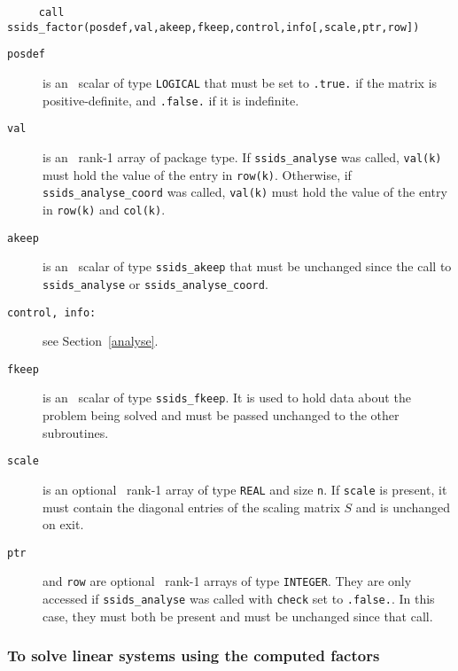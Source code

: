 \documentclass{spral}
\begin{document}
\begin{verbatim}
     call ssids_factor(posdef,val,akeep,fkeep,control,info[,scale,ptr,row])
\end{verbatim}
\vspace*{-3mm}
\begin{description}
\item[\texttt{posdef}] is an \intentin\ scalar of type {\tt LOGICAL} that
must be set to {\tt .true.} if the matrix is positive-definite, and
{\tt .false.} if it is indefinite.

\item[\texttt{val}] is an \intentin\ rank-1 array of package type.
If {\tt ssids\_analyse} was called,  {\tt val(k)} must hold
the value of the entry in {\tt row(k)}.
Otherwise, if  {\tt ssids\_analyse\_coord} was called,  {\tt val(k)}
must hold the value of the entry in {\tt row(k)} and {\tt col(k)}.

\item[\texttt{akeep}]  is an \intentin\ scalar of type
{\tt ssids\_akeep} that must be unchanged since the
call to {\tt ssids\_analyse} or {\tt ssids\_analyse\_coord}.

\item[\texttt{control{\rm ,} info{\rm :}}] see
Section~\ref{analyse}.

\item[\texttt{fkeep}]  is an \intentinout\ scalar of type
{\tt ssids\_fkeep}. It is used to hold data about the problem being
solved and must be passed unchanged to the other subroutines.

\item[\texttt{scale}] is an optional \intentinout\ rank-1 array of type {\tt REAL}
and size  {\tt n}. If {\tt scale} is present, it must contain  the diagonal
entries of the scaling matrix ${S}$ and is unchanged on exit.

\item[\texttt{ptr}] and {\tt row} are optional \intentin\ rank-1 arrays of
type  {\tt INTEGER}. They are only accessed if
{\tt ssids\_analyse} was called
with {\tt check} set to {\tt .false.}.
In this case, they must both be present and  must be unchanged since that call.

\end{description}

\subsubsection{To solve linear systems using the computed factors}
\label{solve}
\end{document}
